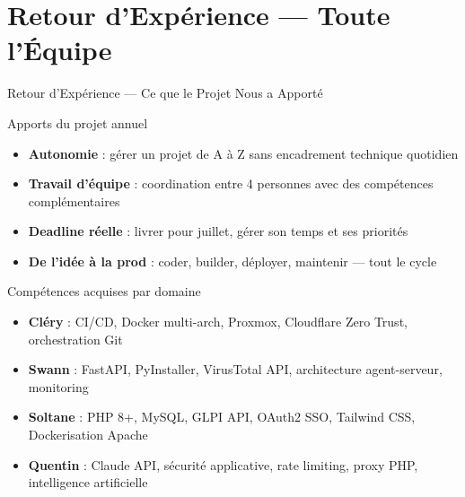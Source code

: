 \documentclass[xcolor=dvipsnames, aspectratio=169, 10pt]{beamer}
\newcommand{\bitem}{\item[$\bullet$]}
\begin{document}
\section{Retour d'Expérience — Toute l'Équipe}
\begin{frame}{Retour d'Expérience — Ce que le Projet Nous a Apporté}
  \begin{block}{Apports du projet annuel}
    \begin{itemize}
      \bitem \textbf{Autonomie} : gérer un projet de A à Z sans encadrement technique quotidien
      \bitem \textbf{Travail d'équipe} : coordination entre 4 personnes avec des compétences complémentaires
      \bitem \textbf{Deadline réelle} : livrer pour juillet, gérer son temps et ses priorités
      \bitem \textbf{De l'idée à la prod} : coder, builder, déployer, maintenir — tout le cycle
    \end{itemize}
  \end{block}
  \vspace{0.2cm}
  \begin{block}{Compétences acquises par domaine}
    \begin{itemize}
      \bitem \textbf{Cléry} : CI/CD, Docker multi-arch, Proxmox, Cloudflare Zero Trust, orchestration Git
      \bitem \textbf{Swann} : FastAPI, PyInstaller, VirusTotal API, architecture agent-serveur, monitoring
      \bitem \textbf{Soltane} : PHP 8+, MySQL, GLPI API, OAuth2 SSO, Tailwind CSS, Dockerisation Apache
      \bitem \textbf{Quentin} : Claude API, sécurité applicative, rate limiting, proxy PHP, intelligence artificielle
    \end{itemize}
  \end{block}
\end{frame}
\end{document}

